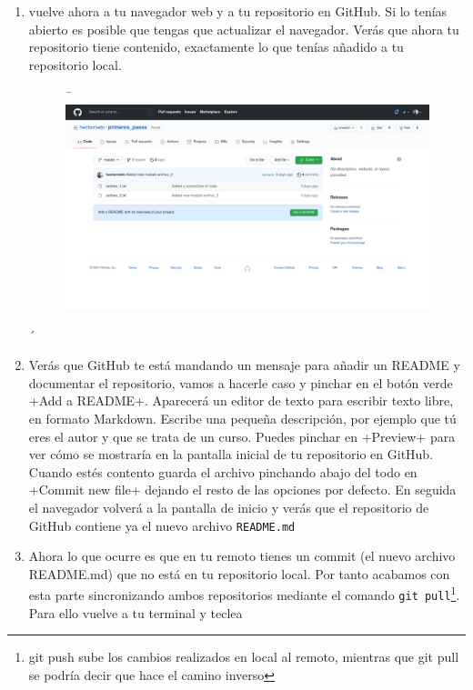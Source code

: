\documentclass[a5paper, oneside,10pt]{article}
\begin{document}
\begin{enumerate}
      \item vuelve ahora a tu navegador web y a tu repositorio en GitHub. Si lo tenías abierto es posible que tengas que actualizar el navegador. Verás que ahora tu repositorio tiene contenido, exactamente lo que tenías añadido a tu repositorio local.
      
      \begin{figure}[H]¯
       \includegraphics[width=\textwidth]{github_add_readme}
      \end{figure}´
      
      \item Verás que GitHub te está mandando un mensaje para añadir un README y documentar el repositorio, vamos a hacerle caso y pinchar en el botón verde \cverb+Add a README+. Aparecerá un editor de texto para escribir texto libre, en formato Markdown. Escribe una pequeña descripción, por ejemplo que tú eres el autor y que se trata de un curso. Puedes pinchar en \cverb+Preview+ para ver cómo se mostraría en la pantalla inicial de tu repositorio en GitHub. Cuando estés contento guarda el archivo pinchando abajo del todo en \cverb+Commit new file+ dejando el resto de las opciones por defecto. En seguida el navegador volverá a la pantalla de inicio y verás que el repositorio de GitHub contiene ya el nuevo archivo \verb+README.md+
      
      \item Ahora lo que ocurre es que en tu remoto tienes un commit (el nuevo archivo README.md) que no está en tu repositorio local. Por tanto acabamos con esta parte sincronizando ambos repositorios mediante el comando \verb+git pull+\footnote{git push sube los cambios realizados en local al remoto, mientras que git pull se podría decir que hace el camino inverso}. Para ello vuelve a tu terminal y teclea 
      

\end{enumerate}
\end{document}
